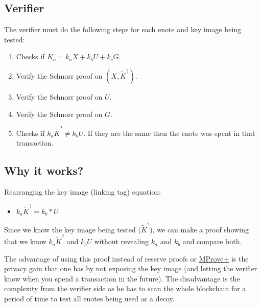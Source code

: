 \documentclass[usletter,11pt,english,oneside,onecolumn,final,openany]{report}
\begin{document}
\subsection{Verifier}

The verifier must do the following steps for each enote and key image being tested:

\begin{enumerate}
\item Checks if $K_o = k_a X + k_b U +k_c G$.
\item Verify the Schnorr proof on ${(X,\tilde{K}^?)}$.
\item Verify the Schnorr proof on ${U}$.
\item Verify the Schnorr proof on ${G}$.
\item Checks if $k_a \tilde{K}^? \neq k_b U$. If they are the same then the enote was spent in that transaction.
\end{enumerate}


\subsection{Why it works?}

Rearranging the key image (linking tag) equation:
\begin{itemize}
    \item $k_a \tilde{K}^? = k_b*U$
\end{itemize}

Since we know the key image being tested ($\tilde{K}^?$), we can make a proof showing that we know $k_a \tilde{K}^?$  and $k_bU$ without revealing $k_a$ and $k_b$ and compare both.

The advantage of using this proof instead of reserve proofs or \href{https://moneroresearch.info/index.php?action=resource\_RESOURCEVIEW\_CORE&id=35}{MProve+} is the privacy gain that one has by not exposing the key image (and letting the verifier know when you spend a transaction in the future).
The disadvantage is the complexity from the verifier side as he has to scan the whole blockchain for a period of time to test all enotes being used as a decoy.
\end{document}
